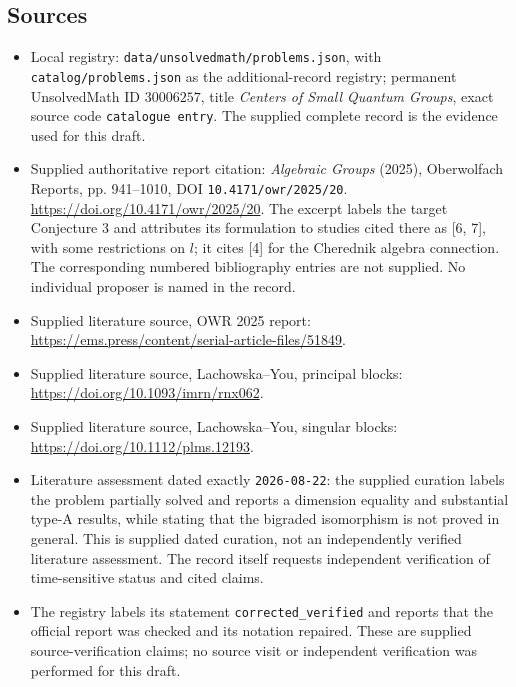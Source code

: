 \documentclass[11pt]{article}
\begin{document}
\subsection{Sources}
\begin{itemize}
\item Local registry: \texttt{data/unsolvedmath/problems.json}, with \texttt{catalog/problems.json} as the additional-record registry; permanent UnsolvedMath ID \(30006257\), title \emph{Centers of Small Quantum Groups}, exact source code \texttt{catalogue entry}. The supplied complete record is the evidence used for this draft.
\item Supplied authoritative report citation: \emph{Algebraic Groups} (2025), Oberwolfach Reports, pp. 941--1010, DOI \texttt{10.4171/owr/2025/20}. \url{https://doi.org/10.4171/owr/2025/20}. The excerpt labels the target Conjecture 3 and attributes its formulation to studies cited there as [6, 7], with some restrictions on \(l\); it cites [4] for the Cherednik algebra connection. The corresponding numbered bibliography entries are not supplied. No individual proposer is named in the record.
\item Supplied literature source, OWR 2025 report: \url{https://ems.press/content/serial-article-files/51849}.
\item Supplied literature source, Lachowska--You, principal blocks: \url{https://doi.org/10.1093/imrn/rnx062}.
\item Supplied literature source, Lachowska--You, singular blocks: \url{https://doi.org/10.1112/plms.12193}.
\item Literature assessment dated exactly \texttt{2026-08-22}: the supplied curation labels the problem partially solved and reports a dimension equality and substantial type-A results, while stating that the bigraded isomorphism is not proved in general. This is supplied dated curation, not an independently verified literature assessment. The record itself requests independent verification of time-sensitive status and cited claims.
\item The registry labels its statement \texttt{corrected\_verified} and reports that the official report was checked and its notation repaired. These are supplied source-verification claims; no source visit or independent verification was performed for this draft.
\end{itemize}
\end{document}
